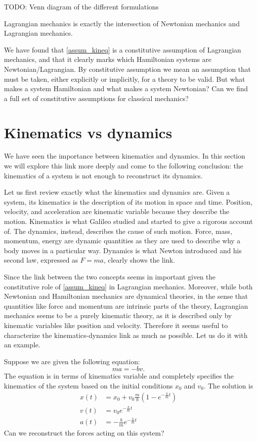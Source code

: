 TODO: Venn diagram of the different formulations

Lagrangian mechanics is exactly the intersection of Newtonian mechanics and Lagrangian mechanics.

We have found that \ref{assum_kineq} is a constitutive assumption of Lagrangian mechanics, and that it clearly marks which Hamiltonian systems are Newtonian/Lagrangian. By constitutive assumption we mean an assumption that must be taken, either explicitly or implicitly, for a theory to be valid. But what makes a system Hamiltonian and what makes a system Newtonian? Can we find a full set of constitutive assumptions for classical mechanics?

\section{Kinematics vs dynamics}

We have seen the importance between kinematics and dynamics. In this section we will explore this link more deeply and come to the following conclusion: the kinematics of a system is not enough to reconstruct its dynamics. 

Let us first review exactly what the kinematics and dynamics are. Given a system, its kinematics is the description of its motion in space and time. Position, velocity, and acceleration are kinematic variable because they describe the motion. Kinematics is what Galileo studied and started to give a rigorous account of. The dynamics, instead, describes the cause of such motion. Force, mass, momentum, energy are dynamic quantities as they are used to describe why a body moves in a particular way. Dynamics is what Newton introduced and his second law, expressed as $F=ma$, clearly shows the link.

Since the link between the two concepts seems in important given the constitutive role of \ref{assum_kineq} in Lagrangian mechanics. Moreover, while both Newtonian and Hamiltonian mechanics are dynamical theories, in the sense that quantities like force and momentum are intrinsic parts of the theory, Lagrangian mechanics seems to be a purely kinematic theory, as it is described only by kinematic variables like position and velocity. Therefore it seems useful to characterize the kinematics-dynamics link as much as possible. Let us do it with an example.

Suppose we are given the following equation:
\begin{equation}\label{rp-cm-frictionEquation}
	m a = - b v .
\end{equation}
The equation is in terms of kinematics variable and completely specifies the kinematics of the system based on the initial conditions $x_0$ and $v_0$.
The solution is
\begin{equation}
	\begin{aligned}
	x(t)&= x_0 + v_0 \frac{m}{b} \left( 1 - e^{-\frac{b}{m}t}\right) \\
	v(t)&= v_0 e^{-\frac{b}{m}t} \\
	a(t)&= - \frac{b}{m} e^{-\frac{b}{m}t}
	\end{aligned}
\end{equation}
Can we reconstruct the forces acting on this system?

